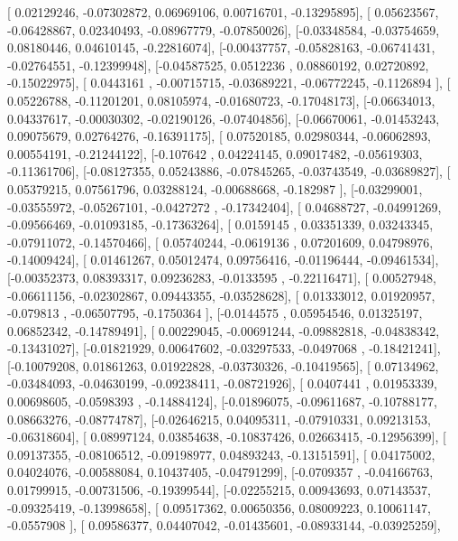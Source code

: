 \documentclass{article}
\begin{document}
       [ 0.02129246, -0.07302872,  0.06969106,  0.00716701, -0.13295895],
       [ 0.05623567, -0.06428867,  0.02340493, -0.08967779, -0.07850026],
       [-0.03348584, -0.03754659,  0.08180446,  0.04610145, -0.22816074],
       [-0.00437757, -0.05828163, -0.06741431, -0.02764551, -0.12399948],
       [-0.04587525,  0.0512236 ,  0.08860192,  0.02720892, -0.15022975],
       [ 0.0443161 , -0.00715715, -0.03689221, -0.06772245, -0.1126894 ],
       [ 0.05226788, -0.11201201,  0.08105974, -0.01680723, -0.17048173],
       [-0.06634013,  0.04337617, -0.00030302, -0.02190126, -0.07404856],
       [-0.06670061, -0.01453243,  0.09075679,  0.02764276, -0.16391175],
       [ 0.07520185,  0.02980344, -0.06062893,  0.00554191, -0.21244122],
       [-0.107642  ,  0.04224145,  0.09017482, -0.05619303, -0.11361706],
       [-0.08127355,  0.05243886, -0.07845265, -0.03743549, -0.03689827],
       [ 0.05379215,  0.07561796,  0.03288124, -0.00688668, -0.182987  ],
       [-0.03299001, -0.03555972, -0.05267101, -0.0427272 , -0.17342404],
       [ 0.04688727, -0.04991269, -0.09566469, -0.01093185, -0.17363264],
       [ 0.0159145 ,  0.03351339,  0.03243345, -0.07911072, -0.14570466],
       [ 0.05740244, -0.0619136 ,  0.07201609,  0.04798976, -0.14009424],
       [ 0.01461267,  0.05012474,  0.09756416, -0.01196444, -0.09461534],
       [-0.00352373,  0.08393317,  0.09236283, -0.0133595 , -0.22116471],
       [ 0.00527948, -0.06611156, -0.02302867,  0.09443355, -0.03528628],
       [ 0.01333012,  0.01920957, -0.079813  , -0.06507795, -0.1750364 ],
       [-0.0144575 ,  0.05954546,  0.01325197,  0.06852342, -0.14789491],
       [ 0.00229045, -0.00691244, -0.09882818, -0.04838342, -0.13431027],
       [-0.01821929,  0.00647602, -0.03297533, -0.0497068 , -0.18421241],
       [-0.10079208,  0.01861263,  0.01922828, -0.03730326, -0.10419565],
       [ 0.07134962, -0.03484093, -0.04630199, -0.09238411, -0.08721926],
       [ 0.0407441 ,  0.01953339,  0.00698605, -0.0598393 , -0.14884124],
       [-0.01896075, -0.09611687, -0.10788177,  0.08663276, -0.08774787],
       [-0.02646215,  0.04095311, -0.07910331,  0.09213153, -0.06318604],
       [ 0.08997124,  0.03854638, -0.10837426,  0.02663415, -0.12956399],
       [ 0.09137355, -0.08106512, -0.09198977,  0.04893243, -0.13151591],
       [ 0.04175002,  0.04024076, -0.00588084,  0.10437405, -0.04791299],
       [-0.0709357 , -0.04166763,  0.01799915, -0.00731506, -0.19399544],
       [-0.02255215,  0.00943693,  0.07143537, -0.09325419, -0.13998658],
       [ 0.09517362,  0.00650356,  0.08009223,  0.10061147, -0.0557908 ],
       [ 0.09586377,  0.04407042, -0.01435601, -0.08933144, -0.03925259],
\end{document}
